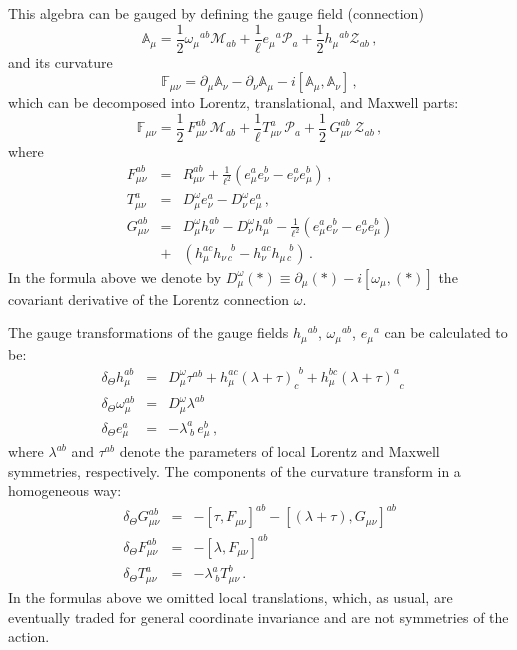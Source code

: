 \documentclass [prd,reprint,eqsecnum,nofootinbib]  {revtex4-1}
\begin{document}
This algebra can be gauged by defining the gauge field (connection)
\begin{equation}\label{2}
\mathbb{A}_{\mu}=\frac{1}{2}\omega_\mu{}^{ab}
\mathcal{M}_{ab}+\frac{1}{\ell}e_\mu{}^{a}
\mathcal{P}_{a}+\frac{1}{2}h_\mu{}^{ab} \mathcal{Z}_{ab}\,,
\end{equation}
and its curvature
\begin{equation}\label{3}
\mathbb{F}_{\mu\nu}=\partial_\mu\mathbb{A}_{\nu}-\partial_\nu\mathbb{A}_{\mu}-i[\mathbb{A}_{\mu},\mathbb{A}_{\nu}]\,,
\end{equation}
which can be decomposed into Lorentz, translational, and Maxwell
parts:
\begin{equation}\label{4}
\mathbb{F}_{\mu\nu}=\frac12\, F_{\mu\nu}^{ab}\, \mathcal{M}_{ab}
+\frac{1}{\ell}T_{\mu\nu}^{a}\,\mathcal{P}_{a}+ \frac12\,
G_{\mu\nu}^{ab}\, \mathcal{Z}_{ab}\,,
\end{equation}
where
\begin{eqnarray}
F_{\mu\nu}^{ab}&=&R^{ab}_{\mu\nu}+\frac{1}{\ell^2}( e^a_\mu e^b_\nu- e^a_\nu e^b_\mu) \,,\label{5a}\\
T_{\mu\nu}^{a}&=&D^\omega_\mu e^a_\nu -D^\omega_\nu e^a_\mu\,,\label{5b}\\
G_{\mu\nu}^{ab}&=&D^\omega_\mu h^{ab}_\nu -D^\omega_\nu
h^{ab}_\mu\nonumber-\frac{1}{\ell^2}( e^a_\mu e^b_\nu- e^a_\nu
e^b_\mu)\\ &+&(h^{ac}_\mu h^{\quad b}_{\nu\,c}-h^{ac}_\nu h^{\quad
b}_{\mu\,c})\, .\label{5c}
\end{eqnarray}
In the formula above we denote by $D^\omega_\mu(\ast)\equiv
\partial_\mu(\ast)-i[\omega_\mu,(\ast)]$ the covariant
derivative of the Lorentz connection $\omega$.

The gauge transformations of the gauge fields $h_\mu{}^{ab}$,
$\omega_\mu{}^{ab}$, $e_\mu{}^{a}$ can be calculated to be:
\begin{eqnarray}
        \delta_\Theta h^{ab}_{\mu}&=&D^\omega_\mu \tau^{ab}+
h^{ac}_\mu(\lambda+\tau)_{c}^{\;\,b}+h^{bc}_\mu(\lambda+\tau)^{a}_{\;\;c}\label{6}\quad\\
      \delta_\Theta \omega^{ab}_{\mu}&=& D^\omega_\mu \lambda^{ab}
      \label{7}\\
   \delta_\Theta e^{a}_{\mu}&=&-\lambda^a_{\;b}
    \,e^b_\mu\,,\label{8}
\end{eqnarray}
where $\lambda^{ab}$ and $\tau^{ab}$ denote the parameters of local
Lorentz and Maxwell symmetries, respectively. The
components of the curvature transform in a homogeneous way:
\begin{eqnarray}
        \delta_\Theta G^{ab}_{\mu\nu}&=&-[\tau,F_{\mu\nu}]^{ab}-[(\lambda+\tau),G_{\mu\nu}]^{ab}\label{9}\\
      \delta_\Theta F^{ab}_{\mu\nu}&=&-[\lambda,F_{\mu\nu}]^{ab}  \label{10}\\
    \delta_\Theta
    T^{a}_{\mu\nu}&=&-\lambda^a_{\;b}T^b_{\mu\nu}\,.\label{11}
\end{eqnarray}
In the formulas above we omitted local translations, which, as
usual, are eventually traded for general coordinate invariance
and are not symmetries of the action.
\end{document}
